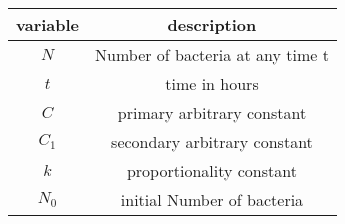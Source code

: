 \begin{tabular}[12pt]{|c|c|}
     \hline
     {variable} & {description}\\
     \hline
     $N$ & Number of bacteria at any time t\\
     \hline
     $t$ & time in hours\\
     \hline
     $C$ & primary arbitrary constant\\
     \hline
     $C_1$ & secondary arbitrary constant\\
     \hline
     $k$ & proportionality constant\\
     \hline
     $N_0$ & initial Number of bacteria\\
     \hline
     
\end{tabular}
